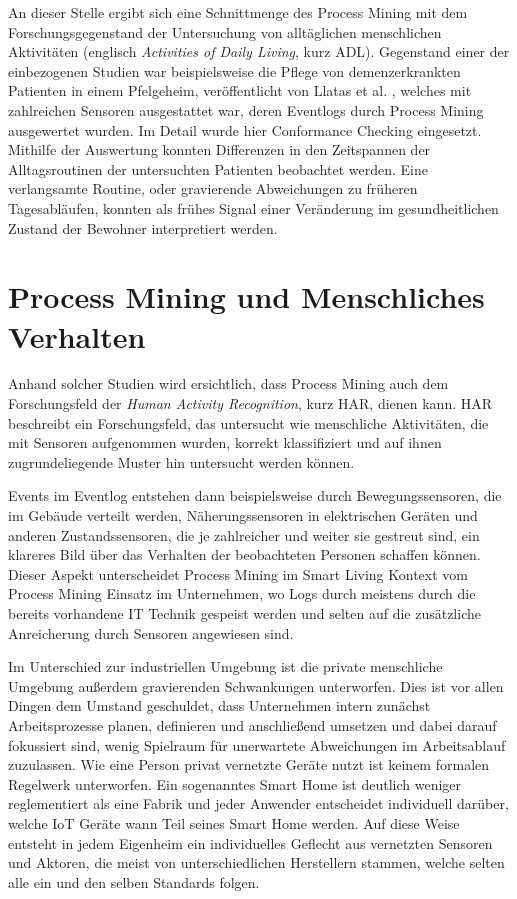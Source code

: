 An dieser Stelle ergibt sich eine Schnittmenge des Process Mining mit dem Forschungsgegenstand der Untersuchung von alltäglichen menschlichen Aktivitäten (englisch \textit{Activities of Daily Living}, kurz ADL). 
Gegenstand einer der einbezogenen Studien war beispielsweise die Pflege von demenzerkrankten Patienten in einem Pfelgeheim, veröffentlicht von Llatas et al. \cite{llatas}, welches mit zahlreichen Sensoren ausgestattet war, deren Eventlogs durch Process Mining ausgewertet wurden. Im Detail wurde hier Conformance Checking eingesetzt. Mithilfe der Auswertung konnten  Differenzen in den Zeitspannen der Alltagsroutinen der untersuchten Patienten beobachtet werden. Eine verlangsamte Routine, oder gravierende Abweichungen zu früheren Tagesabläufen, konnten als frühes Signal einer Veränderung im gesundheitlichen Zustand der Bewohner interpretiert werden.

\section{Process Mining und Menschliches Verhalten}
Anhand solcher Studien wird ersichtlich, dass Process Mining auch dem Forschungsfeld der \textit{Human Activity Recognition}, kurz HAR, dienen kann. HAR beschreibt ein Forschungsfeld, das untersucht wie menschliche Aktivitäten, die mit Sensoren aufgenommen wurden, korrekt klassifiziert und auf ihnen zugrundeliegende Muster hin untersucht werden können. 

Events im Eventlog entstehen dann beispielsweise durch Bewegungssensoren, die im Gebäude verteilt werden, Näherungssensoren in elektrischen Geräten und anderen Zustandssensoren, die je zahlreicher und weiter sie gestreut sind, ein klareres Bild über das Verhalten der beobachteten Personen schaffen können. 
Dieser Aspekt unterscheidet Process Mining im Smart Living Kontext vom Process Mining Einsatz im Unternehmen, wo Logs durch meistens durch die bereits vorhandene IT Technik gespeist werden und selten auf die zusätzliche Anreicherung durch Sensoren angewiesen sind.
 
Im Unterschied zur industriellen Umgebung ist die private menschliche Umgebung außerdem gravierenden Schwankungen unterworfen. Dies ist vor allen Dingen dem Umstand geschuldet, dass Unternehmen intern zunächst Arbeitsprozesse planen, definieren und anschließend umsetzen und dabei darauf fokussiert sind, wenig Spielraum für unerwartete Abweichungen im Arbeitsablauf zuzulassen. 
Wie eine Person privat vernetzte Geräte nutzt ist keinem formalen Regelwerk unterworfen. Ein sogenanntes Smart Home ist deutlich weniger reglementiert als eine Fabrik und jeder Anwender entscheidet individuell darüber, welche IoT Geräte wann Teil seines Smart Home werden. Auf diese Weise entsteht in jedem Eigenheim ein individuelles Geflecht aus vernetzten Sensoren und Aktoren, die meist von unterschiedlichen Herstellern stammen, welche selten alle ein und den selben Standards folgen.

